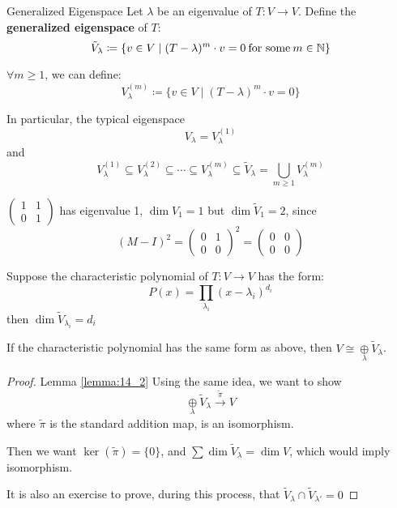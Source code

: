 \begin{definition} {Generalized Eigenspace}
    Let \(\lambda\) be an eigenvalue of \(T: V \to V\). Define the \textbf{generalized eigenspace} of \(T\): \[
        \tilde{V}_\lambda \coloneqq \{ v \in V \mid (T - \lambda)^m \cdot v = 0 \:\text{for some}\:  m \in \mathbb{N} \}
    \]

    \(\forall m \geq 1\), we can define: \[
        V_\lambda^{(m)} \coloneqq \{ v \in V \mid (T - \lambda)^m \cdot v = 0\}
    \]

    In particular, the typical eigenspace \[
        V_\lambda = V_\lambda^{(1)}
    \]
    and \[
        V_\lambda^{(1)} \subseteq V_\lambda^{(2)} \subseteq \cdots  \subseteq V_\lambda^{(m)} \subseteq \tilde{V}_\lambda = \bigcup_{m \geq 1} V_\lambda^{(m)}
    \]
\end{definition}

\begin{example}
    \(\begin{pmatrix}
        1 & 1 \\
        0 & 1
    \end{pmatrix}\) has eigenvalue 1, \(\dim V_1 = 1\) but \(\dim \tilde{V}_1 = 2\), since \[
        (M-I)^2 = \begin{pmatrix}
            0 & 1 \\
            0 & 0
        \end{pmatrix} ^2 = \begin{pmatrix}
            0 & 0 \\
            0 & 0
        \end{pmatrix}
    \]
\end{example}

\begin{lemma}\label{lemma:14_1}
    Suppose the characteristic polynomial of \(T: V \to V\) has the form: \[
        P(x) = \prod_{\lambda_i} (x - \lambda_i)^{d_i}
    \]
    then \(\dim \tilde{V}_{\lambda_i} = d_i\)
\end{lemma}

\begin{lemma}\label{lemma:14_2}
    If the characteristic polynomial has the same form as above, then \(V \cong \underset{\lambda}{\oplus} \tilde{V}_\lambda\).
\end{lemma}

\begin{proof} {Lemma \ref*{lemma:14_2}}
    Using the same idea, we want to show \[
        \underset{\lambda}{\oplus} \tilde{V}_\lambda \xrightarrow{\tilde{\pi}}  V
    \] where \(\tilde{\pi}\)  is the standard addition map, is an isomorphism.

    Then we want \(\ker(\tilde{\pi}) = \{0\}\), and \(\sum \dim \tilde{V}_\lambda = \dim V\), which would imply isomorphism.

    It is also an exercise to prove, during this process, that \(\tilde{V}_\lambda \cap \tilde{V}_{\lambda'} = {0}\)
\end{proof}

